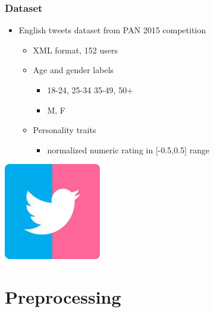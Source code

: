 \documentclass[slidestop,compress,11pt,xcolor=dvipsnames]{beamer}
\begin{document}
\begin{frame}
\frametitle{Dataset}
\begin{itemize}
	\item English tweets dataset from PAN 2015 competition
	\begin{itemize}
			\item XML format, 152 users
			\item Age and gender labels
			\begin{itemize}
				\item 18-24, 25-34 35-49, 50+
				\item M, F
			\end{itemize}
			\item Personality traits
			\begin{itemize}
				\item normalized numeric rating in [-0.5,0.5] range
			\end{itemize}
		\end{itemize}
\end{itemize}
\vspace{2mm}
\centerline{\includegraphics[scale=0.5]{twitter-gender}}
\end{frame}


\section{Preprocessing}

\end{document}
